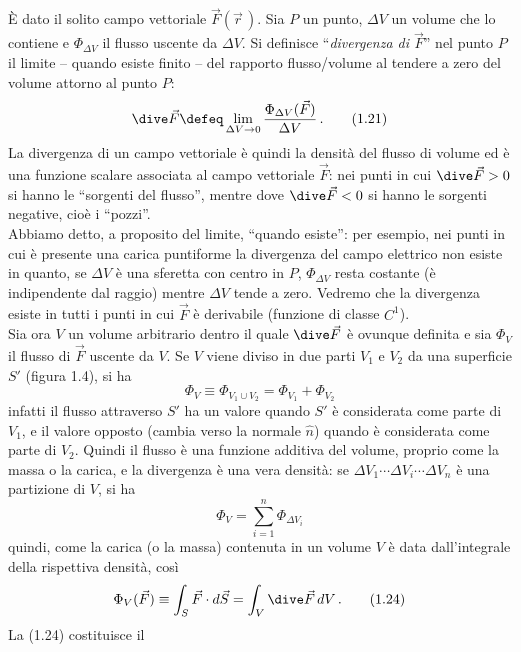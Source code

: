 È dato il solito campo vettoriale $\vec F(\vec r\,)$. Sia $P$ un punto, $\Delta V$ un volume che lo contiene e $\Phi_{\Delta V}$ il flusso uscente da $\Delta V$. Si definisce ``\emph{divergenza di $\vec F$}'' nel punto $P$ il limite -- quando esiste finito -- del rapporto flusso/volume al tendere a zero del volume attorno al punto $P$:
\begin{equation}
\dive\vec F\defeq\lim_{\Delta V\to0}\frac{\Phi_{\Delta V}(\vec F)}{\Delta V}\,.
\tag{1.21}
\end{equation}
La divergenza di un campo vettoriale è quindi la densità del flusso di volume ed è una funzione scalare associata al campo vettoriale $\vec F$: nei punti in cui $\dive\vec F>0$ si hanno le ``sorgenti del flusso'', mentre dove $\dive\vec F<0$ si hanno le sorgenti negative, cioè i ``pozzi''.\\
Abbiamo detto, a proposito del limite, ``quando esiste'': per esempio, nei punti in cui è presente una carica puntiforme la divergenza del campo elettrico non esiste in quanto, se $\Delta V$ è una sferetta con centro in $P$, $\Phi_{\Delta V}$ resta costante (è indipendente dal raggio) mentre $\Delta V$ tende a zero. Vedremo che la divergenza esiste in tutti i punti in cui $\vec F$ è derivabile (funzione di classe $C^1$).\\
Sia ora $V$ un volume arbitrario dentro il quale $\dive\vec F$ è ovunque definita e sia $\Phi_V$ il
flusso di $\vec F$ uscente da $V$. Se $V$ viene diviso in due parti $V_1$ e $V_2$ da una superficie $S'$ (figura 1.4), si ha
\begin{equation}
\Phi_V\equiv\Phi_{V_1\cup V_2}=\Phi_{V_1}+\Phi_{V_2}
\tag{1.22}
\end{equation}
infatti il flusso attraverso $S'$ ha un valore quando $S'$ è considerata come parte di $V_1$, e il valore opposto (cambia verso la normale $\hat n$) quando è considerata come parte di $V_2$. Quindi il flusso è una funzione additiva del volume, proprio come la massa o la carica, e la divergenza è una vera densità: se $\Delta V_1\cdots\Delta V_i\cdots\Delta V_n$ è una partizione di $V$, si ha
\begin{equation}
\Phi_V=\sum_{i=1}^n\Phi_{\Delta V_i}
\tag{1.23}
\end{equation}
quindi, come la carica (o la massa) contenuta in un volume $V$ è data dall'integrale della rispettiva densità, così
\begin{equation}
\Phi_V(\vec F)\equiv\int_S\vec F\cdot d\vec S=\int_V\dive\vec F\,dV\,.
\tag{1.24}
\end{equation}
La (1.24) costituisce il

